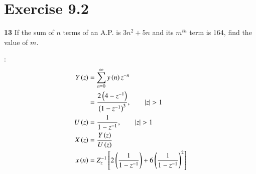 \documentclass[journal,12pt,twocolumn]{IEEEtran}
\begin{document}


\vspace{3cm}

\title{}
\author{EE23BTECH11054 -  Sai Krishna Shanigarapu$^{*}$
}
\maketitle
\newpage
\bigskip


\section*{Exercise 9.2}

\noindent \textbf{13} \hspace{2pt}If the sum of $n$ terms of an A.P. is $3n^2+5n$ and its $m^{th}$ term is 164, find the value of $m$.
\bigskip

\solution:
\noindent
\begin{align}
Y\left(z\right) &=  \sum_{n=0}^{\infty} y\left(n\right)z^{-n} \\
&= \frac{2\left(4-z^{-1}\right)}{\left(1-z^{-1}\right)^3}, \qquad |z| > 1\\
U\left(z\right) &= \frac{1}{1-z^{-1}}, \qquad |z| > 1\\
X\left(z\right) &=  \frac{Y\left(z\right)}{U\left(z\right)}\\
x\left(n\right) &= Z_{z}^{-1}\left[2\left(\frac{1}{1-z^{-1}}\right) + 6\left(\frac{1}{1-z^{-1}}\right) ^2\right]
\end{align}
\end{document}
